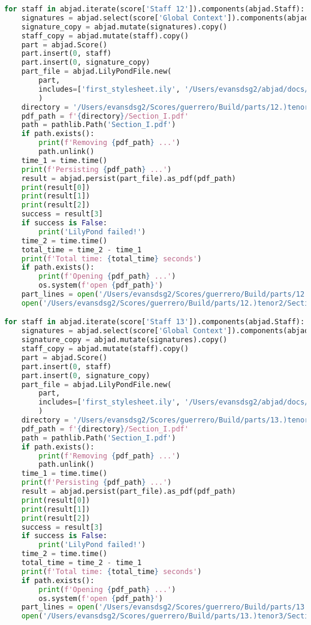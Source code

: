 \begin{lstlisting}[language=Python, caption=Invocation Source Code]
for staff in abjad.iterate(score['Staff 12']).components(abjad.Staff):
    signatures = abjad.select(score['Global Context']).components(abjad.Staff)
    signature_copy = abjad.mutate(signatures).copy()
    staff_copy = abjad.mutate(staff).copy()
    part = abjad.Score()
    part.insert(0, staff)
    part.insert(0, signature_copy)
    part_file = abjad.LilyPondFile.new(
        part,
        includes=['first_stylesheet.ily', '/Users/evansdsg2/abjad/docs/source/_stylesheets/abjad.ily'],
        )
    directory = '/Users/evansdsg2/Scores/guerrero/Build/parts/12.)tenor2'
    pdf_path = f'{directory}/Section_I.pdf'
    path = pathlib.Path('Section_I.pdf')
    if path.exists():
        print(f'Removing {pdf_path} ...')
        path.unlink()
    time_1 = time.time()
    print(f'Persisting {pdf_path} ...')
    result = abjad.persist(part_file).as_pdf(pdf_path)
    print(result[0])
    print(result[1])
    print(result[2])
    success = result[3]
    if success is False:
        print('LilyPond failed!')
    time_2 = time.time()
    total_time = time_2 - time_1
    print(f'Total time: {total_time} seconds')
    if path.exists():
        print(f'Opening {pdf_path} ...')
        os.system(f'open {pdf_path}')
    part_lines = open('/Users/evansdsg2/Scores/guerrero/Build/parts/12.)tenor2/Section_I.ly').readlines()
    open('/Users/evansdsg2/Scores/guerrero/Build/parts/12.)tenor2/Section_I.ly', 'w').writelines(part_lines[15:-1])

for staff in abjad.iterate(score['Staff 13']).components(abjad.Staff):
    signatures = abjad.select(score['Global Context']).components(abjad.Staff)
    signature_copy = abjad.mutate(signatures).copy()
    staff_copy = abjad.mutate(staff).copy()
    part = abjad.Score()
    part.insert(0, staff)
    part.insert(0, signature_copy)
    part_file = abjad.LilyPondFile.new(
        part,
        includes=['first_stylesheet.ily', '/Users/evansdsg2/abjad/docs/source/_stylesheets/abjad.ily'],
        )
    directory = '/Users/evansdsg2/Scores/guerrero/Build/parts/13.)tenor3'
    pdf_path = f'{directory}/Section_I.pdf'
    path = pathlib.Path('Section_I.pdf')
    if path.exists():
        print(f'Removing {pdf_path} ...')
        path.unlink()
    time_1 = time.time()
    print(f'Persisting {pdf_path} ...')
    result = abjad.persist(part_file).as_pdf(pdf_path)
    print(result[0])
    print(result[1])
    print(result[2])
    success = result[3]
    if success is False:
        print('LilyPond failed!')
    time_2 = time.time()
    total_time = time_2 - time_1
    print(f'Total time: {total_time} seconds')
    if path.exists():
        print(f'Opening {pdf_path} ...')
        os.system(f'open {pdf_path}')
    part_lines = open('/Users/evansdsg2/Scores/guerrero/Build/parts/13.)tenor3/Section_I.ly').readlines()
    open('/Users/evansdsg2/Scores/guerrero/Build/parts/13.)tenor3/Section_I.ly', 'w').writelines(part_lines[15:-1])


\end{lstlisting}
